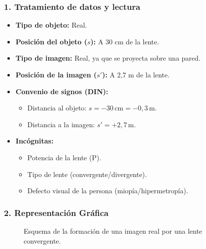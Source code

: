 \subsubsection*{1. Tratamiento de datos y lectura}
\begin{itemize}
    \item \textbf{Tipo de objeto:} Real.
    \item \textbf{Posición del objeto ($s$):} A 30 cm de la lente.
    \item \textbf{Tipo de imagen:} Real, ya que se proyecta sobre una pared.
    \item \textbf{Posición de la imagen ($s'$):} A 2,7 m de la lente.
    \item \textbf{Convenio de signos (DIN):}
    \begin{itemize}
        \item Distancia al objeto: $s = -30\,\text{cm} = -0,3\,\text{m}$.
        \item Distancia a la imagen: $s' = +2,7\,\text{m}$.
    \end{itemize}
    \item \textbf{Incógnitas:}
    \begin{itemize}
        \item Potencia de la lente (P).
        \item Tipo de lente (convergente/divergente).
        \item Defecto visual de la persona (miopía/hipermetropía).
    \end{itemize}
\end{itemize}

\subsubsection*{2. Representación Gráfica}
\begin{figure}[H]
    \centering
    \caption{Esquema de la formación de una imagen real por una lente convergente.}
\end{figure}

